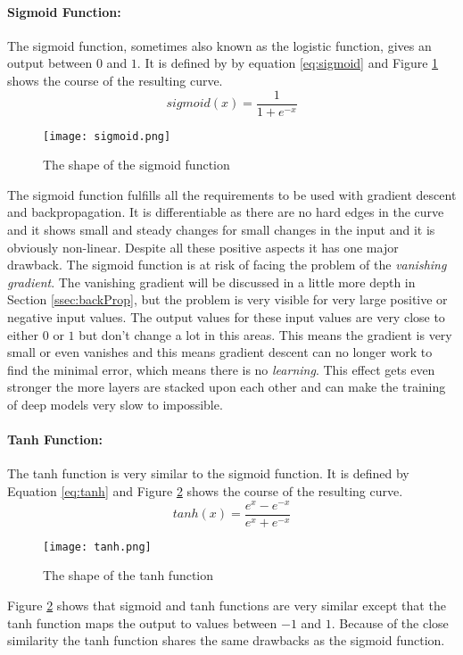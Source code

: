 \paragraph{Sigmoid Function:}
The sigmoid function, sometimes also known as the logistic function, gives an output between $0$ and $1$. 
It is defined by by equation \ref{eq:sigmoid} and Figure \ref{fig:sigmoid} shows the course of the resulting curve.
\begin{equation}\label{eq:sigmoid}
sigmoid(x) = \frac{1}{1 + e^{-x}}
\end{equation}
\begin{figure}
\centering
  \texttt{[image: sigmoid.png]}
  \caption{The shape of the sigmoid function \cite{Chris2017}}
  \label{fig:sigmoid}
\end{figure}
The sigmoid function fulfills all the requirements to be used with gradient descent and backpropagation. 
It is differentiable as there are no hard edges in the curve and it shows small and steady changes for small changes in the input and it is obviously non-linear. Despite all these positive aspects it has one major drawback.
The sigmoid function is at risk of facing the problem of the \emph{vanishing gradient}. The vanishing gradient will be discussed in a little more depth in Section \ref{ssec:backProp}, but the problem is very visible for very large positive or negative input values.
The output values for these input values are very close to either $0$ or $1$ but don't change a lot in this areas. 
This means the gradient is very small or even vanishes and this means gradient descent can no longer work to find the minimal error, which means there is no \emph{learning}.
This effect gets even stronger the more layers are stacked upon each other and can make the training of deep models very slow to impossible.

\paragraph{Tanh Function:}
The tanh function is very similar to the sigmoid function.
It is defined by Equation \ref{eq:tanh} and Figure \ref{fig:tanh} shows the course of the resulting curve.
\begin{equation}\label{eq:tanh}
tanh(x) = \frac{e^x - e^{-x}}{e^x + e^{-x}}
\end{equation}
\begin{figure}
\centering
  \texttt{[image: tanh.png]}
  \caption{The shape of the tanh function \cite{Chris2017}}
  \label{fig:tanh}
\end{figure}
Figure \ref{fig:tanh} shows that sigmoid and tanh functions are very similar except that the tanh function maps the output to values between $-1$ and $1$.
Because of the close similarity the tanh function shares the same drawbacks as the sigmoid function.


